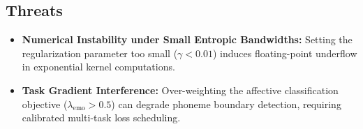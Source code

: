 \subsection{Threats}
\begin{itemize}
    \item \textbf{Numerical Instability under Small Entropic Bandwidths:} Setting the regularization parameter too small ($\gamma < 0.01$) induces floating-point underflow in exponential kernel computations.
    \item \textbf{Task Gradient Interference:} Over-weighting the affective classification objective ($\lambda_{\text{emo}} > 0.5$) can degrade phoneme boundary detection, requiring calibrated multi-task loss scheduling.
\end{itemize}
